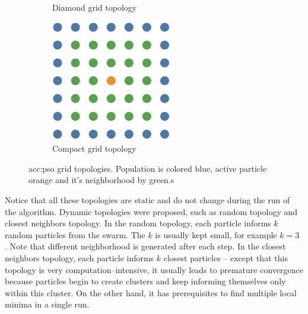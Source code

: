 \begin{figure}[b]
\begin{subfigure}[t]{0.3\textwidth}
        \caption{Diamond grid topology}
        \label{fig:topologygriddiamond}
    \end{subfigure}
    \hfill
    \begin{subfigure}[t]{0.3\textwidth}
        \includegraphics[width=\textwidth]{img/master_neigh_compact.pdf}
        \caption{Compact grid topology}
        \label{fig:topologygridcompact}
    \end{subfigure}
    \caption[\acrshort*{acc:pso} grid topologies]{\acrshort*{acc:pso} grid topologies. Population is colored blue, active particle orange and it's neighborhood by green.s}
\end{figure}

Notice that all these topologies are static and do not change during the run of the algorithm. Dynamic topologies were proposed, such as random topology and closest neighbors topology. In the random topology, each particle informs $k$ random particles from the swarm. The $k$ is usually kept small, for example $k=3$ \citep{SPSObenchmark}. Note that different neighborhood is generated after each step. In the closest neighbors topology, each particle informs $k$ closest particles -- except that this topology is very computation--intensive, it usually leads to premature convergence because particles begin to create clusters and keep informing themselves only within this cluster. On the other hand, it has prerequisites to find multiple local minima in a single run.

